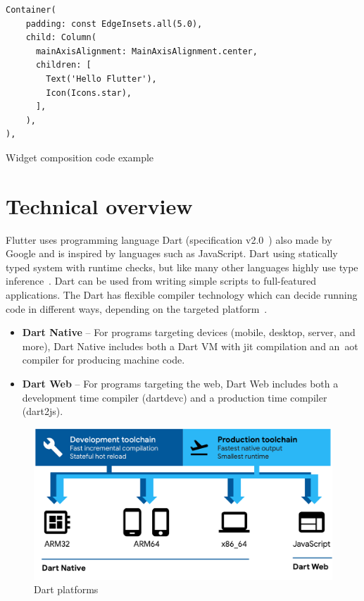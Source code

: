 \begin{listing}[ht]
\begin{verbatim}
Container(
    padding: const EdgeInsets.all(5.0),
    child: Column(
      mainAxisAlignment: MainAxisAlignment.center,
      children: [
        Text('Hello Flutter'),
        Icon(Icons.star),
      ],
    ),
),
\end{verbatim}
\caption{Widget composition code example}
\label{listing:hello-flutter}
\end{listing}
\section{Technical overview}
Flutter uses programming language Dart (specification v2.0~\cite{dart-specs}) also made by Google and is inspired by languages such as JavaScript. Dart using statically typed system with runtime checks, but like many other languages highly use type inference~\cite{dart-type-system}. Dart can be used from writing simple scripts to full-featured applications. The Dart has flexible compiler technology which can decide running code in different ways, depending on the targeted platform~\cite{dart-platforms}. 

\begin{itemize}
    \item \textbf{Dart Native} -- For programs targeting devices (mobile, desktop, server, and more), Dart Native includes both a Dart VM with \gls{jit} compilation and an~\gls{aot} compiler for producing machine code.
    \item \textbf{Dart Web} -- For programs targeting the web, Dart Web includes both a development time compiler (dartdevc) and a production time compiler (dart2js).
\end{itemize}

\begin{figure}[htp]
    \centering
    \includegraphics[width=0.8\linewidth]{img/flutter/dart-platforms.pdf}
    \caption{Dart platforms~\cite{dart-platforms}}
    \label{fig:dart-platform}
\end{figure}

